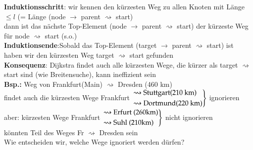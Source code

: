 \documentclass[11pt, fleqn]{scrreprt}
\begin{document}
        \textbf{Induktionsschritt}: wir kennen den kürzesten Weg zu allen Knoten mit Länge $\leq l$ (= Länge (node $\rightarrow$ parent $\rightsquigarrow$ start)\\
        dann ist das nächste Top-Element (node $\rightarrow$ parent $\rightsquigarrow$ start) der kürzeste Weg für node $\rightsquigarrow$ start (s.o.) \\

        \textbf{Induktionsende}:Sobald das Top-Element (target $\rightarrow$ parent $\rightsquigarrow$ start) ist haben wir den kürzesten Weg target $\rightsquigarrow$ start gefunden\\

        \textbf{Konsequenz}: Dijkstra findet auch alle kürzesten Wege, die kürzer als target $\rightsquigarrow$ start sind (wie Breitensuche), kann ineffizient sein\\

        \textbf{Bsp.:} Weg von Frankfurt(Main) $\rightsquigarrow$ Dresden (460 km)\\
        \hspace*{0.5cm} findet auch die kürzesten Wege Frankfurt $\begin{rcases}\rightsquigarrow \text{Stuttgart(210 km)} \\ \rightsquigarrow
        \text{Dortmund(220 km)} \end{rcases}$ ignorieren\\

        \hspace*{0.5cm} aber: kürzesten Wege Frankfurt $\begin{rcases} \rightsquigarrow \text{Erfurt (260km)} \\
        \rightsquigarrow \text{Suhl (210km)} \end{rcases}$ nicht ignorieren \\
        \hspace*{0.5cm} könnten Teil des Weges Fr $\rightsquigarrow$ Dresden sein\\

        Wie entscheiden wir, welche Wege ignoriert werden dürfen?
\end{document}
